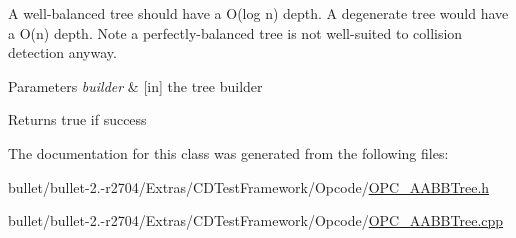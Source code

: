 A well-\/balanced tree should have a O(log n) depth. A degenerate tree would have a O(n) depth. Note a perfectly-\/balanced tree is not well-\/suited to collision detection anyway.


\begin{DoxyParams}{Parameters}
{\em builder} & \mbox{[}in\mbox{]} the tree builder \\
\hline
\end{DoxyParams}
\begin{DoxyReturn}{Returns}
true if success 
\end{DoxyReturn}


The documentation for this class was generated from the following files\+:\begin{DoxyCompactItemize}
\item 
bullet/bullet-\/2.-\/r2704/\+Extras/\+C\+D\+Test\+Framework/\+Opcode/\hyperlink{_o_p_c___a_a_b_b_tree_8h}{O\+P\+C\+\_\+\+A\+A\+B\+B\+Tree.\+h}\item 
bullet/bullet-\/2.-\/r2704/\+Extras/\+C\+D\+Test\+Framework/\+Opcode/\hyperlink{_o_p_c___a_a_b_b_tree_8cpp}{O\+P\+C\+\_\+\+A\+A\+B\+B\+Tree.\+cpp}\end{DoxyCompactItemize}
